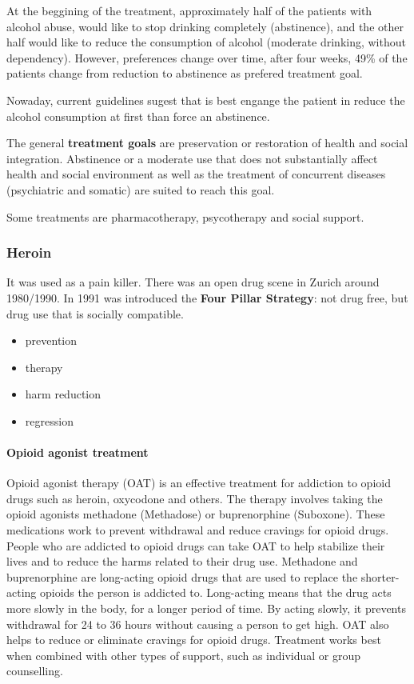 \documentclass[12pt,article,oneside,a4paper]{memoir}
\begin{document}
At the beggining of the treatment, approximately half of the patients with
alcohol abuse, would like to stop drinking completely (abstinence), and the
other half would like to reduce the consumption of alcohol (moderate drinking,
without dependency). However, preferences change over time, after four weeks,
49\% of the patients change from reduction to abstinence as prefered treatment
goal.

Nowaday, current guidelines sugest that is best engange the patient in reduce
the alcohol consumption at first than force an abstinence.

The general \textbf{treatment goals} are preservation or restoration of health
and social integration. Abstinence or a moderate use that does not
substantially affect health and social environment as well as the treatment of
concurrent diseases (psychiatric and somatic) are suited to reach this goal.

Some treatments are pharmacotherapy, psycotherapy and social support.

\subsubsection{Heroin}
It was used as a pain killer. There was an open drug scene in Zurich around
1980/1990. In 1991 was introduced the \textbf{Four Pillar Strategy}: not drug
free, but drug use that is socially compatible.
\begin{itemize}
\item prevention
\item therapy
\item harm reduction
\item regression
\end{itemize}

\paragraph{Opioid agonist treatment}
Opioid agonist therapy (OAT) is an effective treatment for addiction to opioid
drugs such as heroin, oxycodone and others. The therapy involves taking the
opioid agonists methadone (Methadose) or buprenorphine (Suboxone). These
medications work to prevent withdrawal and reduce cravings for opioid drugs.
People who are addicted to opioid drugs can take OAT to help stabilize their
lives and to reduce the harms related to their drug use.
Methadone and buprenorphine are long-acting opioid drugs that are used to
replace the shorter-acting opioids the person is addicted to. Long-acting means
that the drug acts more slowly in the body, for a longer period of time. By
acting slowly, it prevents withdrawal for 24 to 36 hours without causing a
person to get high. OAT also helps to reduce or eliminate cravings for opioid
drugs. Treatment works best when combined with other types of support, such as
individual or group counselling. 
\end{document}
